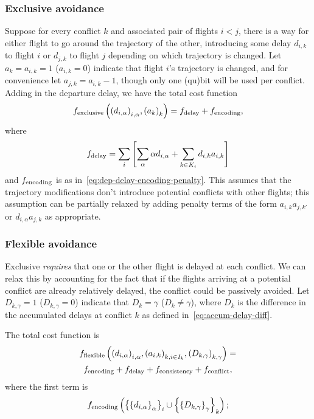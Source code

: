 \subsubsection{Exclusive avoidance}
Suppose for every conflict $k$ and associated pair of flights $i < j$, there is a way for either flight to go around the trajectory of the other, introducing some delay $d_{i,k}$ to flight $i$ or $d_{j, k}$ to flight $j$ depending on which trajectory is changed.
Let $a_k = a_{i, k} = 1$ ($a_{i, k} = 0$) indicate that flight $i$'s trajectory is changed, and for convenience let $a_{j, k} = a_{i, k} - 1$, though only one (qu)bit will be used per conflict. %
Adding in the departure delay, we have the total cost function
\begin{equation}
f_{\mathrm{exclusive}}
\left(
{\left(
  d_{i, \alpha}
\right)}_{i, \alpha},
{\left(a_k\right)}_k
\right)
=
f_{\mathrm{delay}} +
f_{\mathrm{encoding}},
\end{equation}
where 
\begin{equation}
\label{eq:delay-exclusive}
f_{\mathrm{delay}} = 
\sum_{i}
\left[
\sum_{\alpha} \alpha d_{i, \alpha}
+
\sum_{k \in K_i} d_{i, k} a_{i, k}
\right]
\end{equation}
and
$f_{\mathrm{encoding}}$ is as in~\eqref{eq:dep-delay-encoding-penalty}.
This assumes that the trajectory modifications don't introduce potential conflicts with other flights; this assumption can be partially relaxed by adding penalty terms of the form $a_{i,k} a_{j,k'}$ or $d_{i,\alpha} a_{j, k}$ as appropriate.

\subsubsection{Flexible avoidance}
Exclusive \emph{requires} that one or the other flight is delayed at each conflict.
We can relax this by accounting for the fact that if the flights arriving at a potential conflict are already relatively delayed, the conflict could be passively avoided.
Let $D_{k, \gamma} = 1$ ($D_{k, \gamma} = 0$) indicate that $D_k = \gamma$ ($D_k \neq \gamma$), where $D_k$ is the difference in the accumulated delays at conflict $k$ as defined in~\eqref{eq:accum-delay-diff}.

The total cost function is
\begin{multline}
f_{\mathrm{flexible}}
\left(
{\left(d_{i, \alpha}\right)}_{i, \alpha},
{\left(a_{i, k}\right)}_{k, i \in I_k},
{\left(D_{k, \gamma}\right)}_{k, \gamma}
\right)
=\\
f_{\mathrm{encoding}} +
f_{\mathrm{delay}} +
f_{\mathrm{consistency}} + 
f_{\mathrm{conflict}},
\end{multline}
where the first term is
\begin{equation}
f_{\mathrm{encoding}}
\left(
{\left\{
{\left\{
d_{i, \alpha}
\right\}}_{\alpha}
\right\}}_i
\cup
{\left\{
{\left\{
D_{k, \gamma}
\right\}}_{\gamma}
\right\}}_{k}
\right);
\end{equation}

